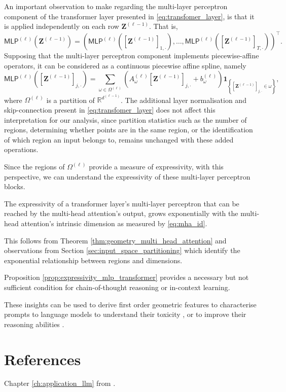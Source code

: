 An important observation to make regarding the multi-layer perceptron component of the transformer layer presented in \eqref{eq:transfomer_layer}, is that it is applied independently on each row $\mathbf{Z}^{(\ell-1)}$. That is, $$\mathsf{MLP}^{(\ell)}\left(\mathbf{Z}^{(\ell-1)}\right)=\left(\mathsf{MLP}^{(\ell)}\left(\left[\mathbf{Z}^{(\ell-1)}\right]_{1,\cdot}\right),\dots,\mathsf{MLP}^{(\ell)}\left(\left[\mathbf{Z}^{(\ell-1)}\right]_{T,\cdot}\right)\right)^\top.$$Supposing that the multi-layer perceptron component implements piecewise-affine operators, it can be considered as a continuous piecewise affine spline, namely $$\mathsf{MLP}^{(\ell)}\left(\left[\mathbf{Z}^{(\ell-1)}\right]_{j,\cdot}\right)=\sum_{\omega\in\Omega^{(\ell)}}\left(A_{\omega}^{(\ell)}\left[\mathbf{Z}^{(\ell-1)}\right]_{j,\cdot}+b^{(\ell)}_{\omega}\right)\mathbf{1}_{\left\{\left[\mathbf{Z}^{(\ell-1)}\right]_{j,\cdot}\in\omega\right\}},$$where $\Omega^{(\ell)}$ is a partition of $\mathbb{R}^{d^{(\ell-1)}}$. The additional layer normalisation and skip-connection present in \eqref{eq:transfomer_layer} does not affect this interpretation for our analysis, since partition statistics such as the number of regions, determining whether points are in the same region, or the identification of which region an input belongs to, remains unchanged with these added operations.

Since the regions of $\Omega^{(\ell)}$ provide a measure of expressivity, with this perspective, we can understand the expressivity of these multi-layer perceptron blocks.

\begin{proposition}\label{prop:expressivity_mlp_transformer}
    The expressivity of a transformer layer's multi-layer perceptron that can be reached by the multi-head attention's output, grows exponentially with the multi-head attention's intrinsic dimension as measured by \eqref{eq:mha_id}.
\end{proposition}

\begin{tproof}
    This follows from Theorem \ref{thm:geometry_multi_head_attention} and observations from Section \ref{sec:input_space_partitioning} which identify the exponential relationship between regions and dimensions.
\end{tproof}

Proposition \ref{prop:expressivity_mlp_transformer} provides a necessary but not sufficient condition for chain-of-thought reasoning or in-context learning.

These insights can be used to derive first order geometric features to characterise prompts to language models to understand their toxicity \citet{balestrieroCharacterizingLargeLanguage2023}, or to improve their reasoning abilities \citet{cosentinoReasoningLargeLanguage2024}.

\section{References}

Chapter \ref{ch:application_llm} from \citet{balestrieroCharacterizingLargeLanguage2023}.